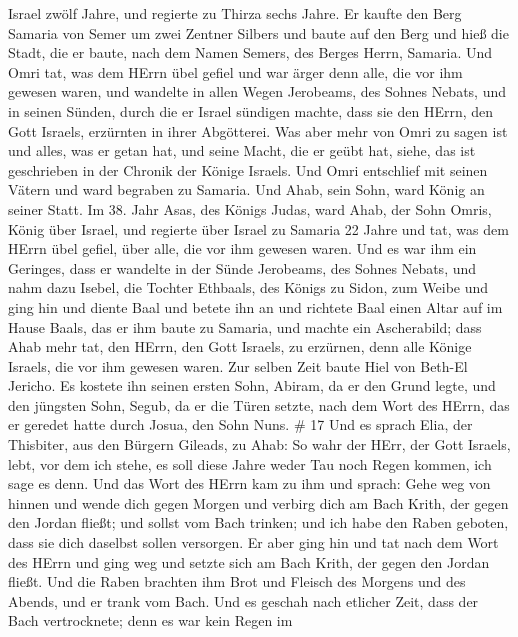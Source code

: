 Israel zwölf Jahre, und regierte zu Thirza sechs Jahre.  Er
kaufte den Berg Samaria von Semer um zwei Zentner Silbers und baute auf
den Berg und hieß die Stadt, die er baute, nach dem Namen Semers, des
Berges Herrn, Samaria.  Und Omri tat, was dem HErrn übel
gefiel und war ärger denn alle, die vor ihm gewesen waren, 
und wandelte in allen Wegen Jerobeams, des Sohnes Nebats, und in seinen
Sünden, durch die er Israel sündigen machte, dass sie den HErrn, den
Gott Israels, erzürnten in ihrer Abgötterei.  Was aber mehr
von Omri zu sagen ist und alles, was er getan hat, und seine Macht, die
er geübt hat, siehe, das ist geschrieben in der Chronik der Könige
Israels.  Und Omri entschlief mit seinen Vätern und ward
begraben zu Samaria. Und Ahab, sein Sohn, ward König an seiner Statt.
 Im 38. Jahr Asas, des Königs Judas, ward Ahab, der Sohn
Omris, König über Israel, und regierte über Israel zu Samaria 22 Jahre
 und tat, was dem HErrn übel gefiel, über alle, die vor ihm
gewesen waren.  Und es war ihm ein Geringes, dass er
wandelte in der Sünde Jerobeams, des Sohnes Nebats, und nahm dazu
Isebel, die Tochter Ethbaals, des Königs zu Sidon, zum Weibe und ging
hin und diente Baal und betete ihn an  und richtete Baal
einen Altar auf im Hause Baals, das er ihm baute zu Samaria,
 und machte ein Ascherabild; dass Ahab mehr tat, den HErrn,
den Gott Israels, zu erzürnen, denn alle Könige Israels, die vor ihm
gewesen waren.  Zur selben Zeit baute Hiel von Beth-El
Jericho. Es kostete ihn seinen ersten Sohn, Abiram, da er den Grund
legte, und den jüngsten Sohn, Segub, da er die Türen setzte, nach dem
Wort des HErrn, das er geredet hatte durch Josua, den Sohn Nuns. \# 17
 Und es sprach Elia, der Thisbiter, aus den Bürgern Gileads,
zu Ahab: So wahr der HErr, der Gott Israels, lebt, vor dem ich stehe, es
soll diese Jahre weder Tau noch Regen kommen, ich sage es denn.
 Und das Wort des HErrn kam zu ihm und sprach: 
Gehe weg von hinnen und wende dich gegen Morgen und verbirg dich am Bach
Krith, der gegen den Jordan fließt;  und sollst vom Bach
trinken; und ich habe den Raben geboten, dass sie dich daselbst sollen
versorgen.  Er aber ging hin und tat nach dem Wort des HErrn
und ging weg und setzte sich am Bach Krith, der gegen den Jordan fließt.
 Und die Raben brachten ihm Brot und Fleisch des Morgens und
des Abends, und er trank vom Bach.  Und es geschah nach
etlicher Zeit, dass der Bach vertrocknete; denn es war kein Regen im
